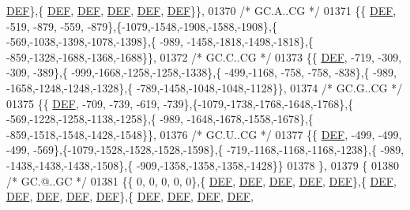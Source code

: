 \begin{DoxyCode}
      \mbox{\hyperlink{1_88_84__epars_8h_a397419fc12b37ed479c8abb9d444d843}{DEF}}\},\{  \mbox{\hyperlink{1_88_84__epars_8h_a397419fc12b37ed479c8abb9d444d843}{DEF}},  \mbox{\hyperlink{1_88_84__epars_8h_a397419fc12b37ed479c8abb9d444d843}{DEF}},  \mbox{\hyperlink{1_88_84__epars_8h_a397419fc12b37ed479c8abb9d444d843}{DEF}},  \mbox{\hyperlink{1_88_84__epars_8h_a397419fc12b37ed479c8abb9d444d843}{DEF}},  \mbox{\hyperlink{1_88_84__epars_8h_a397419fc12b37ed479c8abb9d444d843}{DEF}}\}\},
01370 \textcolor{comment}{/* GC.A..CG */}
01371 \{\{  \mbox{\hyperlink{1_88_84__epars_8h_a397419fc12b37ed479c8abb9d444d843}{DEF}}, -519, -879, -559, -879\},\{-1079,-1548,-1908,-1588,-1908\},\{ -569,-1038,-1398,-1078,-1398\},\{ -989,
      -1458,-1818,-1498,-1818\},\{ -859,-1328,-1688,-1368,-1688\}\},
01372 \textcolor{comment}{/* GC.C..CG */}
01373 \{\{  \mbox{\hyperlink{1_88_84__epars_8h_a397419fc12b37ed479c8abb9d444d843}{DEF}}, -719, -309, -309, -389\},\{ -999,-1668,-1258,-1258,-1338\},\{ -499,-1168, -758, -758, -838\},\{ -989,
      -1658,-1248,-1248,-1328\},\{ -789,-1458,-1048,-1048,-1128\}\},
01374 \textcolor{comment}{/* GC.G..CG */}
01375 \{\{  \mbox{\hyperlink{1_88_84__epars_8h_a397419fc12b37ed479c8abb9d444d843}{DEF}}, -709, -739, -619, -739\},\{-1079,-1738,-1768,-1648,-1768\},\{ -569,-1228,-1258,-1138,-1258\},\{ -989,
      -1648,-1678,-1558,-1678\},\{ -859,-1518,-1548,-1428,-1548\}\},
01376 \textcolor{comment}{/* GC.U..CG */}
01377 \{\{  \mbox{\hyperlink{1_88_84__epars_8h_a397419fc12b37ed479c8abb9d444d843}{DEF}}, -499, -499, -499, -569\},\{-1079,-1528,-1528,-1528,-1598\},\{ -719,-1168,-1168,-1168,-1238\},\{ -989,
      -1438,-1438,-1438,-1508\},\{ -909,-1358,-1358,-1358,-1428\}\}
01378 \},
01379 \{
01380 \textcolor{comment}{/* GC.@..GC */}
01381 \{\{    0,    0,    0,    0,    0\},\{  \mbox{\hyperlink{1_88_84__epars_8h_a397419fc12b37ed479c8abb9d444d843}{DEF}},  \mbox{\hyperlink{1_88_84__epars_8h_a397419fc12b37ed479c8abb9d444d843}{DEF}},  \mbox{\hyperlink{1_88_84__epars_8h_a397419fc12b37ed479c8abb9d444d843}{DEF}},  \mbox{\hyperlink{1_88_84__epars_8h_a397419fc12b37ed479c8abb9d444d843}{DEF}},  \mbox{\hyperlink{1_88_84__epars_8h_a397419fc12b37ed479c8abb9d444d843}{DEF}}\},\{  
      \mbox{\hyperlink{1_88_84__epars_8h_a397419fc12b37ed479c8abb9d444d843}{DEF}},  \mbox{\hyperlink{1_88_84__epars_8h_a397419fc12b37ed479c8abb9d444d843}{DEF}},  \mbox{\hyperlink{1_88_84__epars_8h_a397419fc12b37ed479c8abb9d444d843}{DEF}},  \mbox{\hyperlink{1_88_84__epars_8h_a397419fc12b37ed479c8abb9d444d843}{DEF}},  \mbox{\hyperlink{1_88_84__epars_8h_a397419fc12b37ed479c8abb9d444d843}{DEF}}\},\{  \mbox{\hyperlink{1_88_84__epars_8h_a397419fc12b37ed479c8abb9d444d843}{DEF}},  \mbox{\hyperlink{1_88_84__epars_8h_a397419fc12b37ed479c8abb9d444d843}{DEF}},  \mbox{\hyperlink{1_88_84__epars_8h_a397419fc12b37ed479c8abb9d444d843}{DEF}},  \mbox{\hyperlink{1_88_84__epars_8h_a397419fc12b37ed479c8abb9d444d843}{DEF}},  

\end{DoxyCode}
